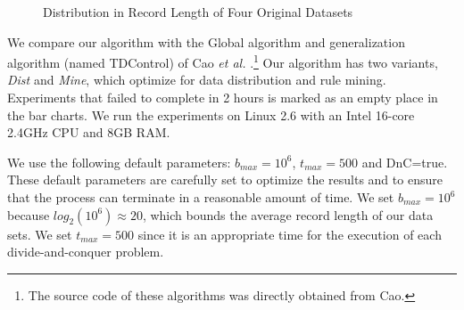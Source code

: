\begin{figure}[th]
\centering
{}
\hfill
{}
\caption{Distribution in Record Length of Four Original Datasets}\label{fig:datasets}
\end{figure}

We compare our algorithm with the
Global algorithm and generalization algorithm
(named TDControl) of
Cao {\em et al.} \cite{Cao:2010:rho}.\footnote{The source code of these
algorithms was directly obtained from Cao.}
Our algorithm has two variants, {\em Dist} and {\em Mine}, which optimize
for data distribution and rule mining.
Experiments that failed to complete in 2 hours is marked
as an empty place in the bar charts.
We run the experiments on Linux 2.6 with an 
Intel 16-core 2.4GHz CPU and 8GB RAM.


We use the following default parameters:
$b_{max} = 10^6$, $t_{max}=500$ and DnC=true.
These default parameters are carefully set to optimize the results
and to ensure that the process can terminate in a reasonable
amount of time.
We set $b_{max} = 10^6$ because $log_2(10^6) \approx 20$,
which bounds the average record length of our data sets.
We set $t_{max} = 500$ since it is an appropriate time
for the execution of each divide-and-conquer problem. 

